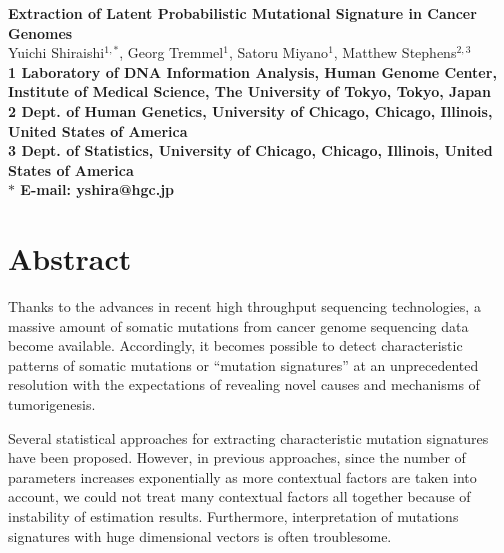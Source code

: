 \date{}

\pagestyle{myheadings}







\begin{flushleft}
{\Large
\textbf{Extraction of Latent Probabilistic Mutational Signature in Cancer Genomes}
}
\\
Yuichi Shiraishi$^{1,\ast}$, 
Georg Tremmel$^{1}$, 
Satoru Miyano$^{1}$, 
Matthew Stephens$^{2,3}$
\\
\bf{1} Laboratory of DNA Information Analysis, Human Genome Center, Institute of Medical Science, The University of Tokyo, Tokyo, Japan
\\
\bf{2} Dept. of Human Genetics, University of Chicago, Chicago, Illinois, United States of America
\\
\bf{3} Dept. of Statistics, University of Chicago, Chicago, Illinois, United States of America
\\
$\ast$ E-mail: yshira@hgc.jp
\end{flushleft}

\section*{Abstract}

Thanks to the advances in recent high throughput sequencing technologies,
a massive amount of somatic mutations from cancer genome sequencing data become available.
Accordingly, it becomes possible to detect characteristic patterns of somatic mutations or ``mutation signatures'' 
at an unprecedented resolution with the expectations of revealing novel causes and mechanisms of tumorigenesis.

Several statistical approaches for extracting characteristic mutation signatures have been proposed.
However, in previous approaches,
since the number of parameters increases exponentially as more contextual factors are taken into account,
we could not treat many contextual factors all together because of instability of estimation results.
Furthermore, interpretation of mutations signatures with huge dimensional vectors is often troublesome.


